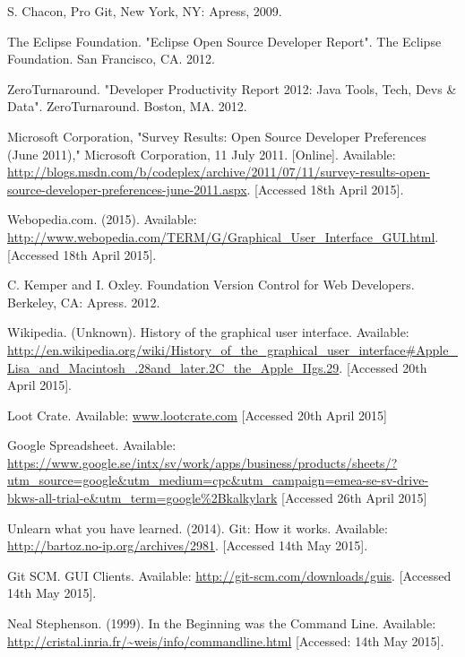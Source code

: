 \documentclass[a4paper,oneside]{bth} %
\begin{document}
\begin{thebibliography}{1}
			S. Chacon, Pro Git, New York, NY: Apress, 2009.
			
			The Eclipse Foundation. "Eclipse Open Source Developer Report". The Eclipse Foundation. San Francisco, CA. 2012.
			
			ZeroTurnaround. "Developer Productivity Report 2012: Java Tools, Tech, Devs \& Data". ZeroTurnaround. Boston, MA. 2012.
			
			Microsoft Corporation, "Survey Results: Open Source Developer Preferences (June 2011)," Microsoft Corporation, 11 July 2011. [Online]. Available: \url{http://blogs.msdn.com/b/codeplex/archive/2011/07/11/survey-results-open-source-developer-preferences-june-2011.aspx}. [Accessed 18th April 2015].
			
			Webopedia.com. (2015). Available: \url{http://www.webopedia.com/TERM/G/Graphical\_User\_Interface\_GUI.html}. [Accessed 18th April 2015].
			
			C. Kemper and I. Oxley. Foundation Version Control for Web Developers. Berkeley, CA: Apress. 2012.
			
			Wikipedia. (Unknown). History of the graphical user interface. Available: \url{http://en.wikipedia.org/wiki/History_of_the_graphical_user_interface#Apple_Lisa_and_Macintosh_.28and_later.2C_the_Apple_IIgs.29}.  [Accessed 20th April 2015].
			
			Loot Crate. Available: \url{www.lootcrate.com} [Accessed 20th April 2015]
			
			Google Spreadsheet. Available: \url{https://www.google.se/intx/sv/work/apps/business/products/sheets/?utm_source=google&utm_medium=cpc&utm_campaign=emea-se-sv-drive-bkws-all-trial-e&utm_term=google%2Bkalkylark} [Accessed 26th April 2015]
			
			Unlearn what you have learned. (2014). Git: How it works. Available: \url{http://bartoz.no-ip.org/archives/2981}. [Accessed 14th May 2015].
			
			Git SCM. GUI Clients. Available: \url{http://git-scm.com/downloads/guis}. [Accessed 14th May 2015].
			
			Neal Stephenson. (1999). In the Beginning was the Command Line. Available: \url{http://cristal.inria.fr/~weis/info/commandline.html}	[Accessed: 14th May 2015].
			

\end{thebibliography}
\end{document}
